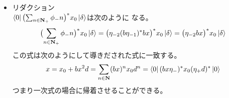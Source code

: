 {\begin{itemize}
		なっている特別な場合である。
		\item リダクション \\
		$\mathinner{\langle{0}|}\bigl(\sum_{n\in\mathbf{N}_+}\phi_-n\bigr)^*x_0\mathinner{|{\delta}\rangle}$は次のように
		なる。
		\begin{equation*}\begin{split}
			\bigl(\sum_{n\in\mathbf{N}_+}\phi_-n\bigr)^*x_0\mathinner{|{\delta}\rangle}
			= \bigl(\eta_{-2}(b\eta_{-1})^*bx\bigr)^*x_0\mathinner{|{\delta}\rangle}
			= \bigl(\eta_{-2}bx\bigr)^*x_0\mathinner{|{\delta}\rangle}
		\end{split}\end{equation*}
		この式は次のようにして導きだされた式に一致する。
		\begin{equation*}\begin{split}
			x = x_0 + bx^2d
			= \sum_{n\in\mathbf{N}}(bx)^nx_0d^n
			= \mathinner{\langle{0}|}(bx\eta_-)^*x_0(\eta_+d)^*\mathinner{|{0}\rangle}
		\end{split}\end{equation*}
		つまり一次式の場合に帰着させることができる。
	\end{itemize} %

}
